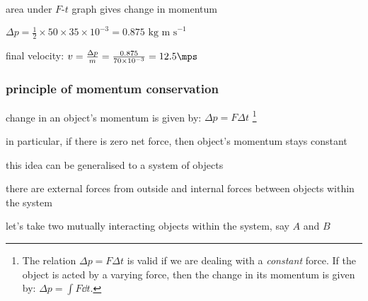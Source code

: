 
\sol area under $F$-$t$ graph gives change in momentum

{
	\centering
	
	$ \Delta p = \frac{1}{2} \times 50 \times 35\times10^{-3} = 0.875 \text{ kg m s}^{-1} $
	
}

final velocity: $v = \frac{\Delta p}{m} = \frac{0.875}{70\times10^{-3}} = 12.5 \mps $ \eoe


%
%
%
%
%
%
%


\subsubsection{principle of momentum conservation}

change in an object's momentum is given by: $\Delta p = F \Delta t$
\footnote{The relation $\Delta p = F \Delta t$ is valid if we are dealing with a \emph{constant} force. If the object is acted by a varying force, then the change in its momentum is given by: $\Delta p = \int F \dd t$.}

in particular, if there is zero net force, then object's momentum stays constant


this idea can be generalised to a system of objects

there are external forces from outside and internal forces between objects within the system

let's take two mutually interacting objects within the system, say $A$ and $B$

